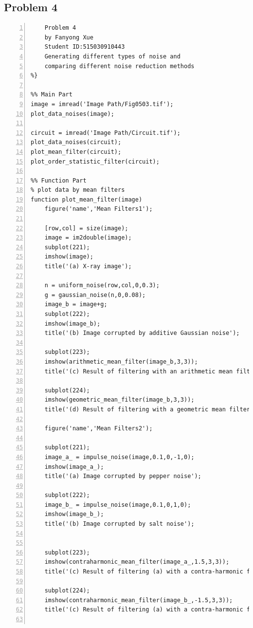 \documentclass[11pt,oneside]{book}
\begin{document}
\begin{appendices}
\section{Problem 4}

\begin{lstlisting}[numbers=left, numberstyle=\tiny,keywordstyle=\color{blue!70},commentstyle=\color{red!50!green!50!blue!50},frame=shadowbox, rulesepcolor=\color{red!20!green!20!blue!20}] 
%{
    Problem 4
    by Fanyong Xue
    Student ID:515030910443
    Generating different types of noise and 
    comparing different noise reduction methods
%}

%% Main Part
image = imread('Image Path/Fig0503.tif');
plot_data_noises(image);

circuit = imread('Image Path/Circuit.tif');
plot_data_noises(circuit);
plot_mean_filter(circuit);
plot_order_statistic_filter(circuit);

%% Function Part
% plot data by mean filters
function plot_mean_filter(image)
    figure('name','Mean Filters1');
    
    [row,col] = size(image);
    image = im2double(image);
    subplot(221);
    imshow(image);
    title('(a) X-ray image');
    
    n = uniform_noise(row,col,0,0.3);
    g = gaussian_noise(n,0,0.08);
    image_b = image+g;
    subplot(222);
    imshow(image_b);
    title('(b) Image corrupted by additive Gaussian noise');
    
    subplot(223);
    imshow(arithmetic_mean_filter(image_b,3,3));
    title('(c) Result of filtering with an arithmetic mean filter');
    
    subplot(224);
    imshow(geometric_mean_filter(image_b,3,3));
    title('(d) Result of filtering with a geometric mean filter');
    
    figure('name','Mean Filters2');
    
    subplot(221);
    image_a_ = impulse_noise(image,0.1,0,-1,0);
    imshow(image_a_);
    title('(a) Image corrupted by pepper noise');
    
    subplot(222);
    image_b_ = impulse_noise(image,0.1,0,1,0);
    imshow(image_b_);
    title('(b) Image corrupted by salt noise');
    
    
    subplot(223);
    imshow(contraharmonic_mean_filter(image_a_,1.5,3,3));
    title('(c) Result of filtering (a) with a contra-harmonic filter');
    
    subplot(224);
    imshow(contraharmonic_mean_filter(image_b_,-1.5,3,3));
    title('(c) Result of filtering (a) with a contra-harmonic filter');
    

\end{lstlisting}
\end{appendices}
\end{document}
